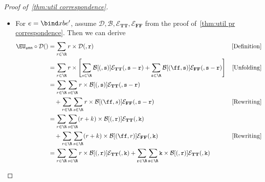 \begin{proof}[Proof of~\cref{thm:util correspondence}]
\begin{itemize}[leftmargin=*]
  \begin{itemize}
    \item If $g(x) = \mathbf{TT}$, then $\denote{e} g = \denote{e'} g$. Also, by following \texttt{bc/obs}, we get that 
    $$EU_{(\varphi, \gamma, R)}(\overline w) 
      = \AMC(\varphi \land R \land \gamma \land x)_{\EU} = \AMC(\varphi \land \gamma\land R)_{\EU}
      $$
    by~\cref{lemma:ind conj prob} and we are done by IH.
    \item If $g(x) = \mathbf{FF}$, then $g \denote{\Gamma} = \pmb{\bot}$. So $\EU \circ (\denote{e} g) (\tt) = 0$. Also, by following \texttt{bc/obs}, we get that 
    $$\AMC(\varphi \land x \land R \land \gamma )_{\Pr} 
    = 0$$
    by~\cref{lemma:ind conj prob} and we are done. 
  \end{itemize}
  the proof for $\ff$ is identical.
  \item For $e = \bind x {b} {e'}$, assume $\mathcal D, \mathcal B, \mathcal{E}_{\mathbf{TT}}, \mathcal{E}_{\mathbf{FF}}$ from the proof of~\cref{thm:util pr correspondence}.
  Then we can derive 
  \begin{align*}
    \EU_{\mathsf{unn}} \circ \mathcal D (\tt)
      &= \sum_{r \in \R} r \times \mathcal D (\tt,r) 
      &\text{[Definition]}\\
      &=\sum_{r \in \R} r \times
        \left[
          \sum_{s \in \R} \mathcal B [(\tt,s)] \mathcal{E}_{\mathbf{TT}} (\tt, s-r)
          + \sum_{s \in \R} \mathcal B [(\ff,s)] \mathcal{E}_{\mathbf{FF}} (\tt, s-r)
        \right]
      &\text{[Unfolding]}\\
      &=\sum_{r \in \R} \sum_{s \in \R} r \times
         \mathcal B [(\tt,s)] \mathcal{E}_{\mathbf{TT}} (\tt, s-r)
      &\\
      &\quad + 
        \sum_{r \in \R }\sum_{s \in \R} r \times \mathcal B [(\ff,s)] \mathcal{E}_{\mathbf{FF}} (\tt, s-r)
      &\text{[Rewriting]}\\
      &=\sum_{r \in \R} \sum_{s \in \R} (r + k) \times
         \mathcal B [(\tt,r)] \mathcal{E}_{\mathbf{TT}} (\tt, k)
      &\\
      &\quad + 
        \sum_{r \in \R }\sum_{s \in \R} (r + k) \times \mathcal B [(\ff,r)] \mathcal{E}_{\mathbf{FF}} (\tt, k)
      &\text{[Rewriting]}\\
      &=\sum_{r \in \R} \sum_{s \in \R} r \times 
         \mathcal B [(\tt,r)] \mathcal{E}_{\mathbf{TT}} (\tt, k)
      + \sum_{r \in \R} \sum_{s \in \R} k \times 
         \mathcal B [(\tt,r)] \mathcal{E}_{\mathbf{TT}} (\tt, k)
      &\\

\end{align*}
\end{itemize}
\end{proof}
